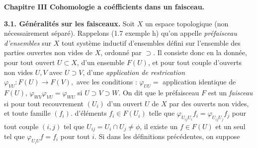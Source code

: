\begin{center}\textbf{Chapitre III Cohomologie a coéfficients dans un faisceau.}\end{center}

\textbf{3.1. Généralités sur les faisceaux.}\quad
{}
Soit $X$ un espace topologique (non nécessairement séparé). Rappelons (1.7
exemple h) qu'on appelle \textit{préfaisceau d'ensembles} sur $X$ tout système
inductif d'ensembles défini sur l'ensemble des parties ouvertes non vides de
$X$, ordonné par $\supset$. Il consiste donc en la donnée, pour tout ouvert
$U\subset X$, d'un ensemble $F(U)$, et pour tout couple d'ouverts non vides
$U,V$ avec $U\supset V$, d'une \textit{application de restrication}
$\varphi_{VU}:F(U)\to F(V),$
avec les conditions : $\varphi_{UU}=$ application identique de $F(U)$,
$\varphi_{WV}\varphi_{VU}=\varphi_{WU}$ si
$U\supset V\supset W$. On dit que le préfaisceau $F$ est un \textit{faisceau}
si pour tout recouvrement $(U_i)$ d'un ouvert $U$ de $X$ par des ouverts non
vides, et toute famille $(f_i)$. d'éléments $f_i\in F(U_i)$ telle que
$\varphi_{U_{ij}U_i}f_i=\varphi_{U_{ij}U_j}f_j$
pour tout couple $(i,j)$ tel que $U_{ij}=U_i\cap U_j\ne\phi$, il existe
un $f\in F(U)$ et un seul tel que $\varphi_{U_iU}f=f_i$ pour tout $i$. Si dans
les définitions précédentes, on suppose

